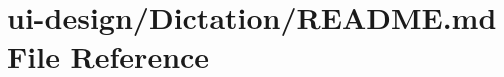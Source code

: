 \hypertarget{Dictation_2README_8md}{}\section{ui-\/design/\+Dictation/\+R\+E\+A\+D\+ME.md File Reference}
\label{Dictation_2README_8md}
